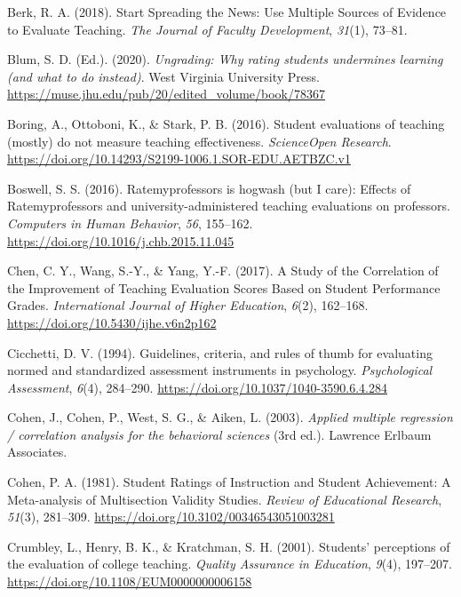 \documentclass[
  man]{apa7}
\newlength{\cslhangindent}
\newenvironment{CSLReferences}[2] %
 {\begin{list}{}{%
  \setlength{\itemindent}{0pt}
  \setlength{\leftmargin}{0pt}
  \setlength{\parsep}{0pt}
  \ifodd #1
   \setlength{\leftmargin}{\cslhangindent}
   \setlength{\itemindent}{-1\cslhangindent}
  \fi
  \setlength{\itemsep}{#2\baselineskip}}}
 {\end{list}}
\begin{document}
\begin{CSLReferences}{1}{0}
Berk, R. A. (2018). Start Spreading the News: Use Multiple Sources of Evidence to Evaluate Teaching. \emph{The Journal of Faculty Development}, \emph{31}(1), 73--81.

Blum, S. D. (Ed.). (2020). \emph{Ungrading: Why rating students undermines learning (and what to do instead)}. West Virginia University Press. \url{https://muse.jhu.edu/pub/20/edited_volume/book/78367}

Boring, A., Ottoboni, K., \& Stark, P. B. (2016). Student evaluations of teaching (mostly) do not measure teaching effectiveness. \emph{ScienceOpen Research}. \url{https://doi.org/10.14293/S2199-1006.1.SOR-EDU.AETBZC.v1}

Boswell, S. S. (2016). Ratemyprofessors is hogwash (but I care): Effects of Ratemyprofessors and university-administered teaching evaluations on professors. \emph{Computers in Human Behavior}, \emph{56}, 155--162. \url{https://doi.org/10.1016/j.chb.2015.11.045}

Chen, C. Y., Wang, S.-Y., \& Yang, Y.-F. (2017). A Study of the Correlation of the Improvement of Teaching Evaluation Scores Based on Student Performance Grades. \emph{International Journal of Higher Education}, \emph{6}(2), 162--168. \url{https://doi.org/10.5430/ijhe.v6n2p162}

Cicchetti, D. V. (1994). Guidelines, criteria, and rules of thumb for evaluating normed and standardized assessment instruments in psychology. \emph{Psychological Assessment}, \emph{6}(4), 284--290. \url{https://doi.org/10.1037/1040-3590.6.4.284}

Cohen, J., Cohen, P., West, S. G., \& Aiken, L. (2003). \emph{Applied multiple regression / correlation analysis for the behavioral sciences} (3rd ed.). Lawrence Erlbaum Associates.

Cohen, P. A. (1981). Student Ratings of Instruction and Student Achievement: A Meta-analysis of Multisection Validity Studies. \emph{Review of Educational Research}, \emph{51}(3), 281--309. \url{https://doi.org/10.3102/00346543051003281}

Crumbley, L., Henry, B. K., \& Kratchman, S. H. (2001). Students{'} perceptions of the evaluation of college teaching. \emph{Quality Assurance in Education}, \emph{9}(4), 197--207. \url{https://doi.org/10.1108/EUM0000000006158}


\end{CSLReferences}
\end{document}
